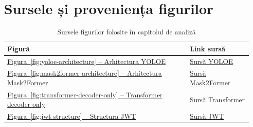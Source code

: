 \appendix
\chapter{Sursele și proveniența figurilor}
\label{anexa:surse-figuri}
\pagestyle{fancy}


\begin{table}[!htbp]
    \caption{Sursele figurilor folosite în capitolul de analiză}
    \centering
    \footnotesize
    \begin{tabular}{|p{}|p{}|}
        \hline
        Figură & Link sursă \\
        \hline
        \hyperref[fig:yoloe-architecture]{Figura~\ref*{fig:yoloe-architecture} -- Arhitectura YOLOE} &
        \href{https://docs.ultralytics.com/models/yoloe/#architecture-overview}{Sursă YOLOE} \\
        \hline
        \hyperref[fig:mask2former-architecture]{Figura~\ref*{fig:mask2former-architecture} -- Arhitectura Mask2Former} &
        \href{https://arxiv.org/pdf/2112.01527}{Sursă Mask2Former} \\
        \hline
        \hyperref[fig:transformer-decoder-only]{Figura~\ref*{fig:transformer-decoder-only} -- Transformer decoder-only} &
        \href{https://substack-post-media.s3.amazonaws.com/public/images/f6133c18-bfaf-4578-8c5a-e5ac7809f65b_1632x784.png}{Sursă Transformer} \\
        \hline
        \hyperref[fig:jwt-structure]{Figura~\ref*{fig:jwt-structure} -- Structura JWT} &
        \href{https://monsterlessons-academy.com/posts/jwt-authentication-beginners-guide-with-real-application}{Sursă JWT} \\
        \hline
    \end{tabular}
    \label{tab:surse-figuri-ai}
\end{table}

